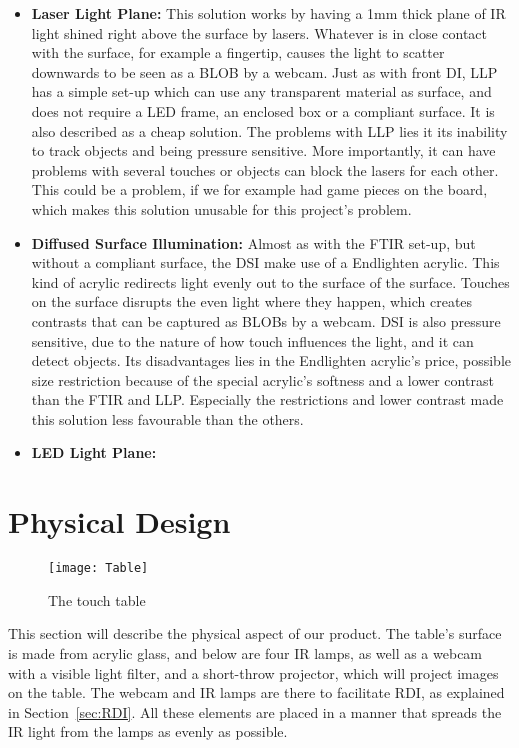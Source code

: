 \begin{itemize}
\item \textbf{Laser Light Plane:} This solution works by having a 1mm thick plane of IR light shined right above the surface by lasers. Whatever is in close contact with the surface, for example a fingertip, causes the light to scatter downwards to be seen as a BLOB by a webcam. Just as with front DI, LLP has a simple set-up which can use any transparent material as surface, and does not require a LED frame, an enclosed box or a compliant surface. It is also described as a cheap solution. The problems with LLP lies it its inability to track objects and being pressure sensitive. More importantly, it can have problems with several touches or objects can block the lasers for each other. This could be a problem, if we for example had game pieces on the board, which makes this solution unusable for this project's problem. 

\item \textbf{Diffused Surface Illumination:} Almost as with the FTIR set-up, but without a compliant surface, the DSI make use of a Endlighten acrylic. This kind of acrylic redirects light evenly out to the surface of the surface.  Touches on the surface disrupts the even light where they happen, which creates contrasts that can be captured as BLOBs by a webcam. DSI is also pressure sensitive, due to the nature of how touch influences the light, and it can detect objects. Its disadvantages lies in the Endlighten acrylic's price, possible size restriction because of the special acrylic's softness and a lower contrast than the FTIR and LLP. Especially the restrictions and lower contrast made this solution less favourable than the others.

\item \textbf{LED Light Plane:}
\end{itemize}

\section{Physical Design} 
\begin{figure} [!h]
\centering \texttt{[image: Table]}
 \caption{The touch table \label{Fig:Table}}
\end{figure}
This section will describe the physical aspect of our product.
The table's surface is made from acrylic glass, and below are four IR lamps, as well as a webcam with a visible light filter, and a short-throw projector, which will project images on the table. The webcam and IR lamps are there to facilitate RDI, as explained in Section~\ref{sec:RDI}. All these elements are placed in a manner that spreads the IR light from the lamps as evenly as possible.


